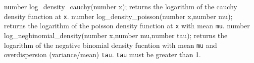 \beginexample
number log_density_cauchy(number x);
\endexample
\noindent returns the logarithm of the cauchy density function 
at {\tt x}.
\beginexample
number log_density_poisson(number x,number mu);
\endexample
\noindent returns the logarithm of the poisson density function 
at {\tt x}
with mean {\tt mu}.
\beginexample
number log_negbinomial_density(number x,number mu,number tau);
\endexample
\noindent returns the logarithm of the negative  binomial density fucntion 
with mean {\tt mu} and overdispersion (variance/mean) {\tt tau}.
{\tt tau} must be greater than 1.

